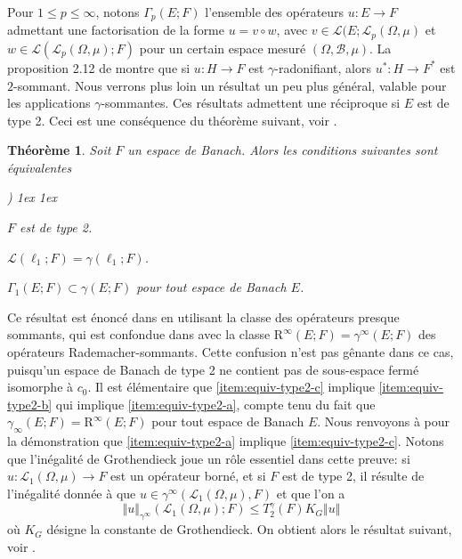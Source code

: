 \documentclass{smfart}
\theoremstyle{plain}
\newtheorem{theorem}{Théorème}[section]
\theoremstyle{definition}
\newcommand{\err}{\mathrm{R}}
\newcommand {\ELL} {{\mathcal L}}
\newcommand {\BOUNDED} {{\mathcal L}}
\newcounter{aufzi}
\newenvironment{aufzi}{\begin{list}{ {\upshape\alph{aufzi})}}{
        \usecounter{aufzi}
        \topsep1ex
        \parsep0cm
        \itemsep1ex
        \leftmargin0.8cm
        \labelwidth0.5cm
        \labelsep0.3cm
}}
{\end{list}}
\begin{document}
\smallskip

Pour $1 \le p \le \infty$, notons $\Gamma_p(E; F)$ l'ensemble des
opérateurs $u: E\to F$ admettant une factorisation de la forme
$u=v\circ w$, avec $v\in \BOUNDED(E;\ELL_p(\Omega, \mu)$ et $w \in
\BOUNDED(\ELL_p(\Omega, \mu);F)$ pour un certain espace mesuré
$(\Omega, {\mathcal B}, \mu)$. La proposition 2.12 de \cite{jvn}
montre que si $u: H \to F$ est $\gamma$-radonifiant, alors $u^*: H \to
F^*$ est $2$-sommant. Nous verrons plus loin un résultat un peu
plus général, valable pour les applications
$\gamma$-sommantes. Ces résultats admettent une réciproque si $E$
est de type 2. Ceci est une conséquence du théorème suivant,
voir \cite[Théorème~12.10]{DJT}.

\begin{theorem}\label{thm:equiv-type2} Soit $F$ un espace de Banach. Alors les conditions
  suivantes sont équivalentes
  \begin{aufzi}
  \item \label{item:equiv-type2-a} $F$ est de type 2.
  \item \label{item:equiv-type2-b} $\BOUNDED(\ell_1;F)=\gamma(\ell_1;F)$.
  \item \label{item:equiv-type2-c} $\Gamma_1(E; F)\subset \gamma(E; F)$ pour tout espace de Banach
    $E$.
\end{aufzi}
\end{theorem}


\noindent Ce résultat est énoncé dans \cite{DJT} en utilisant la
classe des opérateurs presque sommants, qui est confondue dans
\cite{DJT} avec la classe $\err^\infty(E; F)=\gamma^{\infty}(E; F)$ des
opérateurs Rademacher-sommants. Cette confusion n'est pas gênante dans
ce cas, puisqu'un espace de Banach de type 2 ne contient pas de
sous-espace fermé isomorphe à $c_0$.  Il est élémentaire que
\ref{item:equiv-type2-c} implique \ref{item:equiv-type2-b} qui
implique \ref{item:equiv-type2-a}, compte tenu du fait que
$\gamma_{\infty}(E; F)=\err^\infty(E; F)$ pour tout espace de Banach
$E$. Nous renvoyons à \cite[Chapitre 12]{DJT} pour la démonstration
que \ref{item:equiv-type2-a} implique \ref{item:equiv-type2-c}. Notons
que l'inégalité de Grothendieck joue un rôle essentiel dans cette
preuve: si $u: \ELL_1(\Omega, \mu) \to F$ est un opérateur borné, et si
$F$ est de type 2, il résulte de l'inégalité donnée à \cite[page
245]{DJT} que $u \in \gamma^{\infty}(\ELL_1(\Omega, \mu), F)$ et que l'on
a
\begin{equation} 
   \Vert u \Vert_{\gamma^{\infty}}( \ELL_1(\Omega, \mu); F)\le T^{\gamma}_2(F)K_G\Vert u \Vert 
\end{equation}
où $K_G$ désigne la constante de Grothendieck. On obtient alors le
résultat suivant, voir \cite[Corollaire 12.21]{DJT}.
\end{document}

